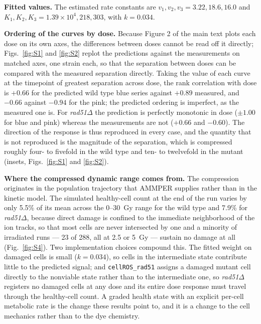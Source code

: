 \documentclass[11pt]{article}
\begin{document}
\textbf{Fitted values.} The estimated rate constants are $v_1, v_2, v_3 = 3.22,
18.6, 16.0$ and $K_1, K_2, K_3 = 1.39 \times 10^4, 218, 303$, with $k = 0.034$.

\textbf{Ordering of the curves by dose.} Because Figure 2 of the main text plots
each dose on its own axes, the differences between doses cannot be
read off it directly; Figs.~\ref{fig:S1} and \ref{fig:S2} replot the predictions
against the measurements on matched axes, one strain each, so that the separation
between doses can be compared with the measured separation directly. Taking the
value of each curve at the timepoint
of greatest separation across dose, the rank correlation with dose is $+0.66$ for
the predicted wild type blue series against $+0.89$ measured, and $-0.66$ against
$-0.94$ for the pink; the predicted ordering is imperfect, as the measured one is.
For \textit{rad51}$\Delta$ the prediction is perfectly monotonic in dose
($\pm 1.00$ for blue and pink) whereas the measurements are not ($+0.66$ and
$-0.60$). The direction of the response is thus reproduced in every case, and the
quantity that is not reproduced is the magnitude of the separation, which is
compressed roughly four- to fivefold in the wild type and ten- to twelvefold in
the mutant (insets, Figs.~\ref{fig:S1} and \ref{fig:S2}).

\textbf{Where the compressed dynamic range comes from.} The compression originates
in the population trajectory that AMMPER supplies rather than in the kinetic
model. The simulated healthy-cell count at the end of the run varies by only 5.5\%
of its mean across the 0--30~Gy range for the wild type and 7.9\% for
\textit{rad51}$\Delta$, because direct damage is confined to the immediate
neighborhood of the ion tracks, so that most cells are never intersected by one and
a minority of irradiated runs --- 23 of 288, all at 2.5 or 5~Gy --- sustain no
damage at all (Fig.~\ref{fig:S4}). Two implementation choices compound this. The fitted weight
on damaged cells is small ($k = 0.034$), so cells in the intermediate state
contribute little to the predicted signal; and \texttt{cellROS\_rad51} assigns a
damaged mutant cell directly to the nonviable state rather than to the
intermediate one, so \textit{rad51}$\Delta$ registers no damaged cells at any dose
and its entire dose response must travel through the healthy-cell count. A graded
health state with an explicit per-cell metabolic rate is the change these results
point to, and it is a change to the cell mechanics rather than to the dye
chemistry.
\end{document}
